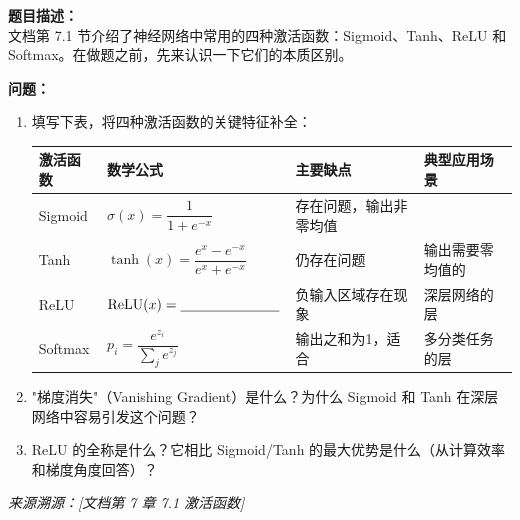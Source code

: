 \documentclass[a4paper,11pt]{ctexart}
\begin{document}
\begin{problembox}
    \textbf{题目描述：}\\
    文档第 7.1 节介绍了神经网络中常用的四种激活函数：Sigmoid、Tanh、ReLU 和 Softmax。在做题之前，先来认识一下它们的本质区别。

    \vspace{0.3cm}
    \textbf{问题：}
    \begin{enumerate}[(1)]
        \item 填写下表，将四种激活函数的关键特征补全：

        \begin{center}
        \begin{tabular}{p{2.0cm} p{4.0cm} p{3.5cm} p{3.5cm}}
            \toprule
            激活函数 & 数学公式 & 主要缺点 & 典型应用场景 \\
            \midrule
            Sigmoid & $\sigma(x) = \dfrac{1}{1+e^{-x}}$ & 存在\underline{\hspace{1.5cm}}问题，输出非零均值 & \underline{\hspace{2.5cm}} \\[2.0em]
            Tanh & $\tanh(x) = \dfrac{e^x - e^{-x}}{e^x + e^{-x}}$ & 仍存在\underline{\hspace{1.0cm}}问题 & 输出需要零均值的\underline{\hspace{1.5cm}} \\[2.0em]
            ReLU & $\text{ReLU}(x) = \underline{\hspace{2.5cm}}$ & 负输入区域存在\underline{\hspace{1.5cm}}现象 & 深层网络的\underline{\hspace{1.5cm}}层 \\[2.0em]
            Softmax & $p_i = \dfrac{e^{z_i}}{\sum_j e^{z_j}}$ & 输出之和为1，适合\underline{\hspace{1.5cm}} & 多分类任务的\underline{\hspace{1.5cm}}层 \\
            \bottomrule
        \end{tabular}
        \end{center}

        \item "梯度消失"（Vanishing Gradient）是什么？为什么 Sigmoid 和 Tanh 在深层网络中容易引发这个问题？
        \item ReLU 的全称是什么？它相比 Sigmoid/Tanh 的最大优势是什么（从计算效率和梯度角度回答）？
    \end{enumerate}

    \vspace{0.2cm}
    {\color{gray}\small\textit{来源溯源：[文档第 7 章 7.1 激活函数]}}
\end{problembox}
\end{document}
